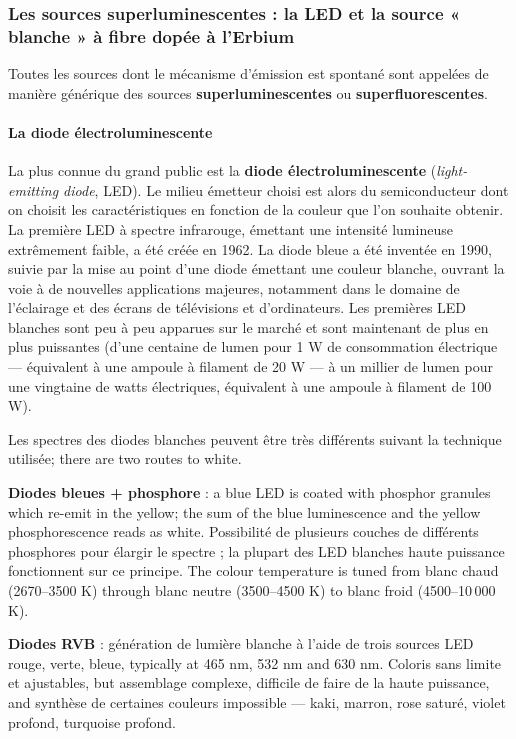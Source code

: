 \subsubsection{Les sources superluminescentes : la LED et la source « blanche » à fibre dopée à l'Erbium}
Toutes les sources dont le mécanisme d'émission est spontané sont appelées de
manière générique des sources \textbf{superluminescentes} ou
\textbf{superfluorescentes}.

\paragraph{La diode électroluminescente}
La plus connue du grand public est la \textbf{diode électroluminescente}
(\textit{light-emitting diode}, LED). Le milieu émetteur choisi est alors du
semiconducteur dont on choisit les caractéristiques en fonction de la couleur
que l'on souhaite obtenir. La première LED à spectre infrarouge, émettant une
intensité lumineuse extrêmement faible, a été créée en 1962. La diode bleue a
été inventée en 1990, suivie par la mise au point d'une diode émettant une
couleur blanche, ouvrant la voie à de nouvelles applications majeures,
notamment dans le domaine de l'éclairage et des écrans de télévisions et
d'ordinateurs. Les premières LED blanches sont peu à peu apparues sur le marché
et sont maintenant de plus en plus puissantes (d'une centaine de lumen pour 1 W
de consommation électrique --- équivalent à une ampoule à filament de 20 W ---
à un millier de lumen pour une vingtaine de watts électriques, équivalent à une
ampoule à filament de 100 W).

Les spectres des diodes blanches peuvent être très différents suivant la
technique utilisée; there are two routes to white.
\begin{subpart}
  \item \textbf{Diodes bleues + phosphore} : a blue LED is coated with phosphor
    granules which re-emit in the yellow; the sum of the blue luminescence and
    the yellow phosphorescence reads as white. Possibilité de plusieurs couches
    de différents phosphores pour élargir le spectre ; la plupart des LED
    blanches haute puissance fonctionnent sur ce principe. The colour
    temperature is tuned from blanc chaud (2670--3500 K) through blanc neutre
    (3500--4500 K) to blanc froid (4500--10\,000 K).
  \item \textbf{Diodes RVB} : génération de lumière blanche à l'aide de trois
    sources LED rouge, verte, bleue, typically at 465 nm, 532 nm and 630 nm.
    Coloris sans limite et ajustables, but assemblage complexe, difficile de
    faire de la haute puissance, and synthèse de certaines couleurs impossible
    --- kaki, marron, rose saturé, violet profond, turquoise profond.
\end{subpart}

